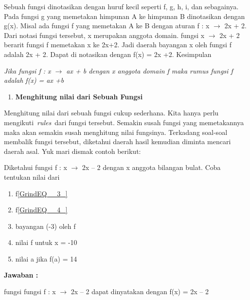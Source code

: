\documentclass[11pt,fleqn]{book} %
\begin{document}
\noindent 

\noindent Sebuah fungsi dinotasikan dengan huruf kecil seperti f, g, h, i, dan sebagainya. Pada fungsi g yang memetakan himpunan A ke himpunan B dinotasikan dengan g(x). Misal ada fungsi f yang memetakan A ke B dengan aturan f : x $\mathrm{\to}$ 2x + 2. Dari notasi fungsi tersebut, x merupakan anggota domain. fungsi x $\mathrm{\to}$ 2x + 2 berarit fungsi f memetakan x ke 2x+2. Jadi daerah bayangan x oleh fungsi f adalah 2x + 2. Dapat di notasikan dengan f(x) = 2x +2. Kesimpulan

\noindent 

\noindent \textit{Jika fungsi f : x $\to$ ax + b dengan x anggota domain f maka rumus fungsi f adalah f(x) = ax +b}

\noindent \textit{}

\begin{enumerate}
\item \textit{ }\textbf{Menghitung nilai dari Sebuah Fungsi}
\end{enumerate}

\noindent 

\noindent Menghitung nilai dari sebuah fungsi cukup sederhana. Kita hanya perlu mengikuti~\textit{rules}~dari fungsi tersebut. Semakin susah fungsi yang memetakannya maka akan semakin susah menghitung nilai fungsinya. Terkadang soal-soal membalik fungsi tersebut, diketahui daerah hasil kemudian diminta mencari daerah asal. Yuk mari dismak contoh berikut:

\noindent 

\noindent Diketahui fungsi f : x $\mathrm{\to}$ 2x -- 2 dengan x anggota bilangan bulat. Coba tentukan nilai dari

\noindent 

\begin{enumerate}
\item  f\eqref{GrindEQ__3_}

\item  f\eqref{GrindEQ__4_}

\item  bayangan (-3) oleh f

\item  nilai f untuk x = -10

\item  nilai a jika f(a) = 14
\end{enumerate}

\noindent 

\noindent \textbf{Jawaban :}

\noindent fungsi fungsi f : x $\mathrm{\to}$ 2x -- 2 dapat dinyatakan dengan f(x) = 2x -- 2
\end{document}
